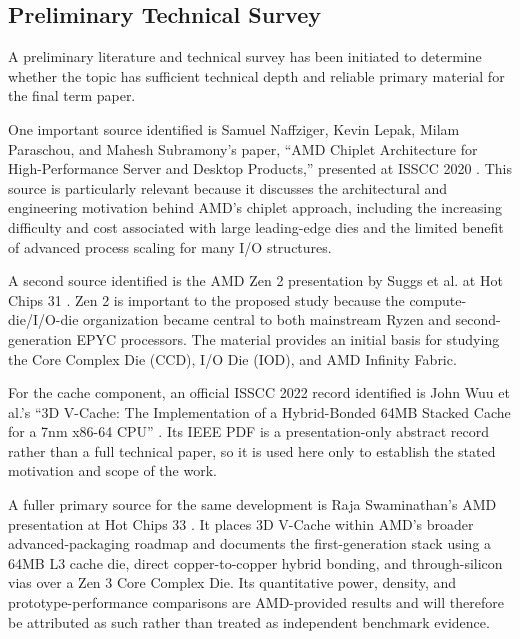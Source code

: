 \subsection{Preliminary Technical Survey}
\label{sec:survey}

A preliminary literature and technical survey has been initiated to determine whether the topic has sufficient technical depth and reliable primary material for the final term paper.

One important source identified is Samuel Naffziger, Kevin Lepak, Milam Paraschou, and Mahesh Subramony's paper, ``AMD Chiplet Architecture for High-Performance Server and Desktop Products,'' presented at ISSCC 2020 \cite{naffziger2020chiplet}. This source is particularly relevant because it discusses the architectural and engineering motivation behind AMD's chiplet approach, including the increasing difficulty and cost associated with large leading-edge dies and the limited benefit of advanced process scaling for many I/O structures.

A second source identified is the AMD Zen 2 presentation by Suggs et al. at Hot Chips 31 \cite{suggs2019zen2}. Zen 2 is important to the proposed study because the compute-die/I/O-die organization became central to both mainstream Ryzen and second-generation EPYC processors. The material provides an initial basis for studying the Core Complex Die (CCD), I/O Die (IOD), and AMD Infinity Fabric.

For the cache component, an official ISSCC 2022 record identified is John Wuu et al.'s ``3D V-Cache: The Implementation of a Hybrid-Bonded 64MB Stacked Cache for a 7nm x86-64 CPU'' \cite{wuu2022vcache}. Its IEEE PDF is a presentation-only abstract record rather than a full technical paper, so it is used here only to establish the stated motivation and scope of the work.

A fuller primary source for the same development is Raja Swaminathan's AMD presentation at Hot Chips 33 \cite{swaminathanAdvancedPackagingEnabling2021}. It places 3D V-Cache within AMD's broader advanced-packaging roadmap and documents the first-generation stack using a 64MB L3 cache die, direct copper-to-copper hybrid bonding, and through-silicon vias over a Zen 3 Core Complex Die. Its quantitative power, density, and prototype-performance comparisons are AMD-provided results and will therefore be attributed as such rather than treated as independent benchmark evidence.

